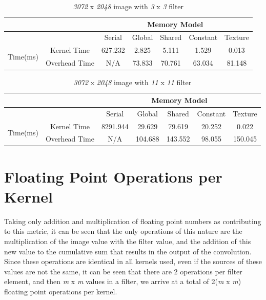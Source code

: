 \documentclass[a4paper,twoside,11pt]{report}
\begin{document}
\begin{table}[H]
	\centering
	\caption{\textit{3072} x \textit{2048} image with \textit{3} x \textit{3} filter}
	\label{im3}
	\begin{tabular}{|c|c|c|c|c|c|c|}
		\hline
		&               & \multicolumn{5}{c|}{Memory Model}             \\ \hline
		&               & Serial & Global & Shared & Constant & Texture \\ \hline
		\multirow{2}{*}{Time(ms)} & Kernel Time   & 627.232 & 2.825  & 5.111  & 1.529    & 0.013   \\ \cline{2-7} 
		& Overhead Time & N/A    & 73.833 & 70.761 & 63.034   & 81.148   \\ \hline
	\end{tabular}
\end{table}

\begin{table}[H]
	\centering
	\caption{\textit{3072} x \textit{2048} image with \textit{11} x \textit{11} filter}
	\label{im11}
	\begin{tabular}{|c|c|c|c|c|c|c|}
		\hline
		&               & \multicolumn{5}{c|}{Memory Model}             \\ \hline
		&               & Serial & Global & Shared & Constant & Texture \\ \hline
		\multirow{2}{*}{Time(ms)} & Kernel Time   & 8291.944 & 29.629  & 79.619  & 20.252    & 0.022   \\ \cline{2-7} 
		& Overhead Time & N/A    & 104.688 & 143.552 & 98.055   & 150.045   \\ \hline
	\end{tabular}
\end{table}



\section{Floating Point Operations per Kernel}
Taking only addition and multiplication of floating point numbers as contributing to this metric, it can be seen that the only operations of this nature are the multiplication of the image value with the filter value, and the addition of this new value to the cumulative sum that results in the output of the convolution. Since these operations are identical in all kernels used, even if the sources of these values are not the same, it can be seen that there are 2 operations per filter element, and then \textit{m} x \textit{m} values in a filter, we arrive at a total of 2(\textit{m} x \textit{m}) floating point operations per kernel.
\end{document}
